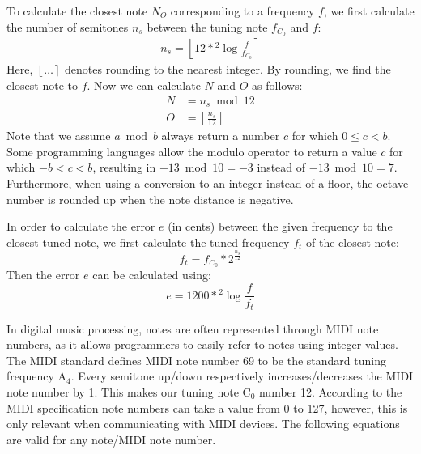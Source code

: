 \documentclass[a4paper,10pt,twocolumn]{article}
\newcommand{\note}[2]{#1${}_{#2}$}
\newcommand{\floor}[1]{\left \lfloor #1 \right \rfloor}
\newcommand{\round}[1]{\left \lfloor #1 \right \rceil}
\begin{document}
To calculate the closest note $N_O$ corresponding to a frequency $f$, we first calculate the number of semitones $n_s$ between the tuning note $f_{C_0}$ and $f$:
\begin{align*}
    n_s = \round{12 * {}^{2}\!\log{\frac{f}{f_{C_0}}}}
\end{align*}
Here, $\round{\ldots}$ denotes rounding to the nearest integer. By rounding, we find the closest note to $f$. Now we can calculate $N$ and $O$ as follows:
\begin{align*}
    N &= n_s \bmod 12 \\
    O &= \floor{\frac{n_s}{12}}
\end{align*}
Note that we assume $a \bmod b$ always return a number $c$ for which $0 \leq c < b$. Some programming languages allow the modulo operator to return a value $c$ for which $-b < c < b$, resulting in $-13 \bmod 10 = -3$ instead of $-13 \bmod 10 = 7$. Furthermore, when using a conversion to an integer instead of a floor, the octave number is rounded up when the note distance is negative.

In order to calculate the error $e$ (in cents) between the given frequency to the closest tuned note, we first calculate the tuned frequency $f_t$ of the closest note:
\[ f_t = f_{C_0} * 2^{\frac{n_s}{12}} \]
Then the error $e$ can be calculated using:
\[ e = 1200 * {}^{2}\!\log{\frac{f}{f_t}} \]

In digital music processing, notes are often represented through MIDI note numbers, as it allows programmers to easily refer to notes using integer values. The MIDI standard defines MIDI note number 69 to be the standard tuning frequency \note{A}{4}. Every semitone up/down respectively increases/decreases the MIDI note number by 1. This makes our tuning note \note{C}{0} number 12. According to the MIDI specification note numbers can take a value from 0 to 127, however, this is only relevant when communicating with MIDI devices. The following equations are valid for any note/MIDI note number.
\end{document}
